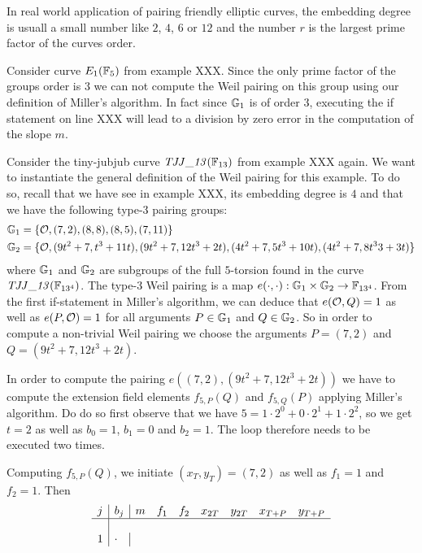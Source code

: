 In real world application of pairing friendly elliptic curves, the embedding degree is usuall a small number like $2$, $4$, $6$ or $12$ and the number $r$ is the largest prime factor of the curves order.
\begin{example}Consider curve $E_1(\mathbb{F}_5)$ from example XXX. Since the only prime factor of the groups order is $3$ we can not compute the Weil pairing on this group using our definition of Miller's algorithm. In fact since $\mathbb{G}_1$ is of order $3$, executing the if statement on line XXX will lead to a division by zero error in the computation of the slope $m$.
\end{example}
\begin{example} Consider the tiny-jubjub curve $\mathit{TJJ\_13}(\mathbb{F}_{13})$ from example XXX again. We want to instantiate the general definition of the Weil pairing for this example. To do so, recall that we have see in example XXX, its embedding degree is $4$ and that we have the following type-3 pairing groups:
\begin{align*}
\mathbb{G}_1 & = \{\mathcal{O}, (7,2), (8,8), (8,5), (7,11)\}\\
\mathbb{G}_2 & = \{\mathcal{O}, (9t^2 + 7,t^3 + 11t), (9t^2 + 7, 12t^3 + 2t), 
(4t^2 + 7, 5t^3 + 10t), (4t^2 + 7, 8t^33 + 3t)\}
\end{align*}
where $\mathbb{G}_1$ and $\mathbb{G}_2$ are subgroups of the full $5$-torsion found in the curve $\mathit{TJJ\_13}(\mathbb{F}_{13^4})$. The type-3 Weil pairing is a map $e(\cdot,\cdot): \mathbb{G}_1 \times \mathbb{G}_2 \to \mathbb{F}_{13^4}$. From the first if-statement in Miller's algorithm, we can deduce that 
$e(\mathcal{O},Q)=1$ as well as $e(P,\mathcal{O})=1$ for all arguments $P\in\mathbb{G}_1$ and $Q\in \mathbb{G}_2$. So in order to compute a non-trivial Weil pairing we choose the arguments 
$P=(7,2)$ and $Q=(9t^2 + 7, 12t^3 + 2t)$. 

In order to compute the pairing $e((7,2),(9t^2 + 7, 12t^3 + 2t))$ we have to compute the extension field elements $f_{5,P}(Q)$ and $f_{5,Q}(P)$ applying Miller's algorithm. Do do so first observe that we have $5 = 1\cdot 2^0 + 0 \cdot 2^1 + 1\cdot 2^2$, so we get $t=2$ as well as $b_0=1$, $b_1=0$ and $b_2=1$. The loop therefore needs to be executed two times. 

Computing $f_{5,P}(Q)$, we initiate $(x_T,y_T) = (7,2)$ as well as $f_1=1$ and $f_2=1$. Then 
$$
\begin{array}{l|l|lllllll}
j & b_j & m & f_1 & f_2 & x_{2T} & y_{2T} & x_{T+P} & y_{T+P}\\
\hline\\
1 & \cdot & 
\end{array}
$$


\end{example}
